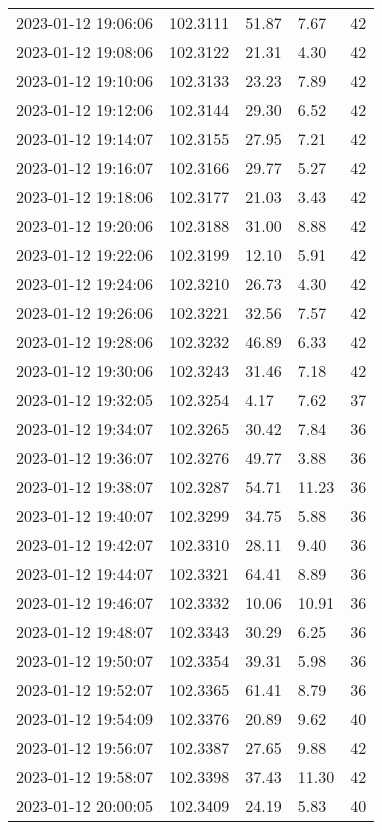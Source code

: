 \documentclass{nature_plusfigure}
\begin{document}
\begin{supplement}
\begin{center}
\begin{longtable}{lllll}
2023-01-12 19:06:06 & 102.3111 & 51.87 & 7.67 & 42 \\ 
2023-01-12 19:08:06 & 102.3122 & 21.31 & 4.30 & 42 \\ 
2023-01-12 19:10:06 & 102.3133 & 23.23 & 7.89 & 42 \\ 
2023-01-12 19:12:06 & 102.3144 & 29.30 & 6.52 & 42 \\ 
2023-01-12 19:14:07 & 102.3155 & 27.95 & 7.21 & 42 \\ 
2023-01-12 19:16:07 & 102.3166 & 29.77 & 5.27 & 42 \\ 
2023-01-12 19:18:06 & 102.3177 & 21.03 & 3.43 & 42 \\ 
2023-01-12 19:20:06 & 102.3188 & 31.00 & 8.88 & 42 \\ 
2023-01-12 19:22:06 & 102.3199 & 12.10 & 5.91 & 42 \\ 
2023-01-12 19:24:06 & 102.3210 & 26.73 & 4.30 & 42 \\ 
2023-01-12 19:26:06 & 102.3221 & 32.56 & 7.57 & 42 \\ 
2023-01-12 19:28:06 & 102.3232 & 46.89 & 6.33 & 42 \\ 
2023-01-12 19:30:06 & 102.3243 & 31.46 & 7.18 & 42 \\ 
2023-01-12 19:32:05 & 102.3254 & 4.17 & 7.62 & 37 \\ 
2023-01-12 19:34:07 & 102.3265 & 30.42 & 7.84 & 36 \\ 
2023-01-12 19:36:07 & 102.3276 & 49.77 & 3.88 & 36 \\ 
2023-01-12 19:38:07 & 102.3287 & 54.71 & 11.23 & 36 \\ 
2023-01-12 19:40:07 & 102.3299 & 34.75 & 5.88 & 36 \\ 
2023-01-12 19:42:07 & 102.3310 & 28.11 & 9.40 & 36 \\ 
2023-01-12 19:44:07 & 102.3321 & 64.41 & 8.89 & 36 \\ 
2023-01-12 19:46:07 & 102.3332 & 10.06 & 10.91 & 36 \\ 
2023-01-12 19:48:07 & 102.3343 & 30.29 & 6.25 & 36 \\ 
2023-01-12 19:50:07 & 102.3354 & 39.31 & 5.98 & 36 \\ 
2023-01-12 19:52:07 & 102.3365 & 61.41 & 8.79 & 36 \\ 
2023-01-12 19:54:09 & 102.3376 & 20.89 & 9.62 & 40 \\ 
2023-01-12 19:56:07 & 102.3387 & 27.65 & 9.88 & 42 \\ 
2023-01-12 19:58:07 & 102.3398 & 37.43 & 11.30 & 42 \\ 
2023-01-12 20:00:05 & 102.3409 & 24.19 & 5.83 & 40 \\ 

\end{longtable}
\end{center}
\end{supplement}
\end{document}

